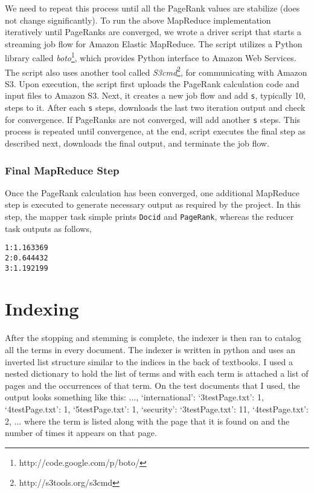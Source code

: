 \documentclass[letterpaper,11pt,twoside]{article}
\begin{document}
We need to repeat this process until all the PageRank values are stabilize (does not change significantly). To run the above MapReduce implementation iteratively until PageRanks are converged, we wrote a driver script that starts a streaming job flow for Amazon Elastic MapReduce. The script utilizes a Python library called \emph{boto}\footnote{http://code.google.com/p/boto/}, which provides Python interface to Amazon Web Services. The script also uses another tool called \emph{S3cmd}\footnote{http://s3tools.org/s3cmd}, for communicating with Amazon S3. Upon execution, the script first uploads the PageRank calculation code and input files to Amazon S3. Next, it creates a new job flow and add \texttt{s}, typically 10, steps to it. After each \texttt{s} steps, downloads the last two iteration output and check for convergence. If PageRanks are not converged, will add another \texttt{s} steps. This process is repeated until convergence, at the end, script executes the final step as described next, downloads the final output, and terminate the job flow.  

\subsubsection{Final MapReduce Step}
Once the PageRank calculation has been converged, one additional MapReduce step is executed to generate necessary output as required by the project. In this step, the mapper task simple prints \texttt{Docid} and \texttt{PageRank}, whereas the reducer task outputs as follows,
\begin{verbatim}
1:1.163369
2:0.644432
3:1.192199
\end{verbatim}

\section{Indexing}
After the stopping and stemming is complete, the indexer is then ran to catalog all the terms in every document. The indexer is written in python and uses an inverted list structure similar to the indices in the back of textbooks. I used a nested dictionary to hold the list of terms and with each term is attached a list of pages and the occurrences of that term.  On the test documents that I used, the output looks something like this:
{..., `international': {`3testPage.txt': 1, `4testPage.txt': 1, `5testPage.txt': 1}, `security': {`3testPage.txt': 11, `4testPage.txt': 2}, ...}
where the term is listed along with the page that it is found on and the number of times it appears on that page.  
\end{document}
